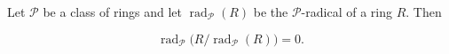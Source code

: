 Let $\mathcal{P}$ be a class of rings and let $\operatorname{rad}_{\mathcal{P}}(R)$ be the $\mathcal{P}$-radical of a ring $R$. Then

$$\operatorname{rad}_{\mathcal{P}}\!\big(R / \operatorname{rad}_{\mathcal{P}}(R)\big) = 0.$$
